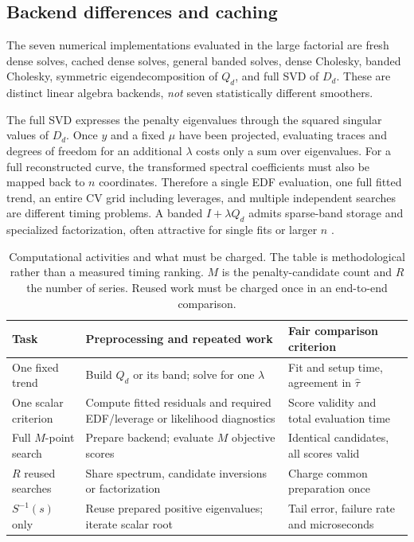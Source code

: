 \subsection{Backend differences and caching}
The seven numerical implementations evaluated in the
large factorial are fresh dense solves, cached dense
solves, general banded solves, dense Cholesky,
banded Cholesky, symmetric eigendecomposition of
$Q_d$, and full SVD of $D_d$.
These are distinct linear algebra backends, \emph{not}
seven statistically different smoothers.

The full SVD expresses the penalty eigenvalues through
the squared singular values of $D_d$.
Once $y$ and a fixed $\mu$ have been projected,
evaluating traces and degrees of freedom for an additional
$\lambda$ costs only a sum over eigenvalues.
For a full reconstructed curve, the transformed spectral
coefficients must also be mapped back to $n$ coordinates.
Therefore a single EDF evaluation, one full fitted trend,
an entire CV grid including leverages, and multiple
independent searches are different timing problems.
A banded $I+\lambda Q_d$ admits sparse-band storage
and specialized factorization, often attractive for
single fits or larger $n$ \cite{weinert2007wh}.

\begin{table}[tbp]
\centering\footnotesize
\caption{Computational activities and what must be charged.
The table is methodological rather than a measured timing
ranking. $M$ is the penalty-candidate count and $R$
the number of series. Reused work must be charged
once in an end-to-end comparison.}
\label{tab:expanded-costs}
\begin{tabular}{p{.19\linewidth}p{.34\linewidth}p{.34\linewidth}}
\toprule
Task & Preprocessing and repeated work & Fair comparison criterion\\
\midrule
One fixed trend
& Build $Q_d$ or its band; solve for one $\lambda$
& Fit and setup time, agreement in $\widehat\tau$\\
One scalar criterion
& Compute fitted residuals and required EDF/leverage or likelihood diagnostics
& Score validity and total evaluation time\\
Full $M$-point search
& Prepare backend; evaluate $M$ objective scores
& Identical candidates, all scores valid\\
$R$ reused searches
& Share spectrum, candidate inversions or factorization
& Charge common preparation once\\
$S^{-1}(s)$ only
& Reuse prepared positive eigenvalues; iterate scalar root
& Tail error, failure rate and microseconds\\
\bottomrule
\end{tabular}
\end{table}

